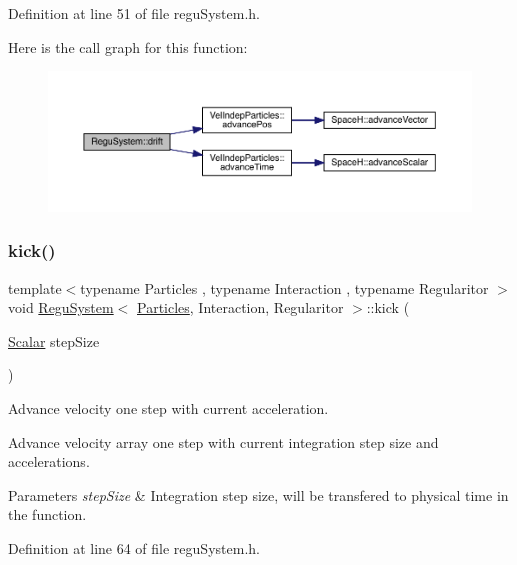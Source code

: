 Definition at line 51 of file regu\+System.\+h.

Here is the call graph for this function\+:\nopagebreak
\begin{figure}[H]
\begin{center}
\leavevmode
\includegraphics[width=350pt]{class_regu_system_aa7566794cc669e07eff8f42cfafee6c2_cgraph}
\end{center}
\end{figure}
\mbox{\label{class_regu_system_aec4eb60d2fe97652cef662db9e8b730f}} 
\subsubsection{\texorpdfstring{kick()}{kick()}}
{\footnotesize\ttfamily template$<$typename Particles , typename Interaction , typename Regularitor $>$ \\
void \mbox{\hyperlink{class_regu_system}{Regu\+System}}$<$ \mbox{\hyperlink{struct_particles}{Particles}}, Interaction, Regularitor $>$\+::kick (\begin{DoxyParamCaption}\item[{\mbox{\hyperlink{class_regu_system_afa2cfdbfed4cc8fa879ca715c78ff240}{Scalar}}}]{step\+Size }\end{DoxyParamCaption})\hspace{0.3cm}{\ttfamily [inline]}}



Advance velocity one step with current acceleration. 

Advance velocity array one step with current integration step size and accelerations. 
\begin{DoxyParams}{Parameters}
{\em step\+Size} & Integration step size, will be transfered to physical time in the function. \\
\hline
\end{DoxyParams}


Definition at line 64 of file regu\+System.\+h.

